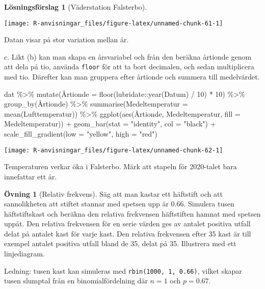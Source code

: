 \documentclass[
]{book}
\newenvironment{Shaded}{\begin{snugshade}}{\end{snugshade}}
\newcommand{\AttributeTok}[1]{\textcolor[rgb]{0.77,0.63,0.00}{#1}}
\newcommand{\DecValTok}[1]{\textcolor[rgb]{0.00,0.00,0.81}{#1}}
\newcommand{\FunctionTok}[1]{\textcolor[rgb]{0.00,0.00,0.00}{#1}}
\newcommand{\NormalTok}[1]{#1}
\newcommand{\SpecialCharTok}[1]{\textcolor[rgb]{0.00,0.00,0.00}{#1}}
\newcommand{\StringTok}[1]{\textcolor[rgb]{0.31,0.60,0.02}{#1}}
\theoremstyle{definition}
\theoremstyle{definition}
\theoremstyle{definition}
\newtheorem{exercise}{Övning}[chapter]
\theoremstyle{definition}
\newtheorem{hypothesis}{Lösningsförslag}[chapter]
\theoremstyle{remark}
\begin{document}
\begin{hypothesis}[Väderstation Falsterbo]
\begin{center}\texttt{[image: R-anvisningar\_files/figure-latex/unnamed-chunk-61-1]} \end{center}

Datan visar på stor variation mellan år.

c. Likt (b) kan man skapa en årsvariabel och från den beräkna årtionde genom att dela på tio, använda \texttt{floor} för att ta bort decimalen, och sedan multiplicera med tio. Därefter kan man gruppera efter årtionde och summera till medelvärdet.

\begin{Shaded}
\begin{Highlighting}[]
\NormalTok{dat }\SpecialCharTok{\%\textgreater{}\%} 
  \FunctionTok{mutate}\NormalTok{(Å}\AttributeTok{rtionde =} \FunctionTok{floor}\NormalTok{(lubridate}\SpecialCharTok{::}\FunctionTok{year}\NormalTok{(Datum) }\SpecialCharTok{/} \DecValTok{10}\NormalTok{) }\SpecialCharTok{*} \DecValTok{10}\NormalTok{) }\SpecialCharTok{\%\textgreater{}\%} 
  \FunctionTok{group\_by}\NormalTok{(Årtionde) }\SpecialCharTok{\%\textgreater{}\%} 
  \FunctionTok{summarise}\NormalTok{(}\AttributeTok{Medeltemperatur =} \FunctionTok{mean}\NormalTok{(Lufttemperatur)) }\SpecialCharTok{\%\textgreater{}\%} 
  \FunctionTok{ggplot}\NormalTok{(}\FunctionTok{aes}\NormalTok{(Årtionde, Medeltemperatur, }\AttributeTok{fill =}\NormalTok{ Medeltemperatur)) }\SpecialCharTok{+}
  \FunctionTok{geom\_bar}\NormalTok{(}\AttributeTok{stat =} \StringTok{"identity"}\NormalTok{, }\AttributeTok{col =} \StringTok{"black"}\NormalTok{) }\SpecialCharTok{+}
  \FunctionTok{scale\_fill\_gradient}\NormalTok{(}\AttributeTok{low =} \StringTok{"yellow"}\NormalTok{, }\AttributeTok{high =} \StringTok{"red"}\NormalTok{)}
\end{Highlighting}
\end{Shaded}

\begin{center}\texttt{[image: R-anvisningar\_files/figure-latex/unnamed-chunk-62-1]} \end{center}

Temperaturen verkar öka i Falsterbo. Märk att stapeln för 2020-talet bara innefattar ett år.
\end{hypothesis}

\begin{exercise}[Relativ frekvens]
Säg att man kastar ett häftstift och att sannolikheten att stiftet stannar med spetsen upp är 0.66. Simulera tusen häftstiftskast och beräkna den relativa frekvensen häftstiften hamnat med spetsen uppåt. Den relativa frekvensen för en serie värden ges av antalet positiva utfall delat på antalet kast för varje kast. Den relativa frekvensen efter 35 kast är till exempel antalet positiva utfall bland de 35, delat på 35.
Illustrera med ett linjediagram.

Ledning: tusen kast kan simuleras med \texttt{rbin(1000,\ 1,\ 0.66)}, vilket skapar tusen slumptal från en binomialfördelning där \(n = 1\) och \(p = 0.67\).
\end{exercise}
\end{document}
